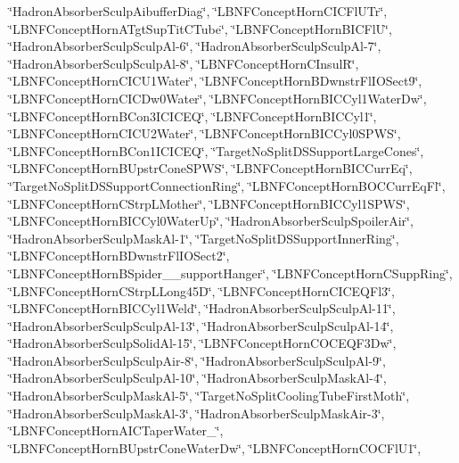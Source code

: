 {\char`\"{}Hadron\-Absorber\-Sculp\-Aibuffer\-Diag\char`\"{}, \char`\"{}L\-B\-N\-F\-Concept\-Horn\-C\-I\-C\-Fl\-U\-Tr\char`\"{}, \char`\"{}L\-B\-N\-F\-Concept\-Horn\-A\-Tgt\-Sup\-Tit\-C\-Tube\char`\"{}, \char`\"{}L\-B\-N\-F\-Concept\-Horn\-B\-I\-C\-Fl\-U\char`\"{}, \char`\"{}Hadron\-Absorber\-Sculp\-Sculp\-Al-\/6\char`\"{}, \char`\"{}Hadron\-Absorber\-Sculp\-Sculp\-Al-\/7\char`\"{}, \char`\"{}Hadron\-Absorber\-Sculp\-Sculp\-Al-\/8\char`\"{}, \char`\"{}L\-B\-N\-F\-Concept\-Horn\-C\-Insul\-R\char`\"{}, \char`\"{}L\-B\-N\-F\-Concept\-Horn\-C\-I\-C\-U1\-Water\char`\"{}, \char`\"{}L\-B\-N\-F\-Concept\-Horn\-B\-Dwnstr\-Fl\-I\-O\-Sect9\char`\"{}, \char`\"{}L\-B\-N\-F\-Concept\-Horn\-C\-I\-C\-Dw0\-Water\char`\"{}, \char`\"{}L\-B\-N\-F\-Concept\-Horn\-B\-I\-C\-Cyl1\-Water\-Dw\char`\"{}, \char`\"{}L\-B\-N\-F\-Concept\-Horn\-B\-Con3\-I\-C\-I\-C\-E\-Q\char`\"{}, \char`\"{}L\-B\-N\-F\-Concept\-Horn\-B\-I\-C\-Cyl1\char`\"{}, \char`\"{}L\-B\-N\-F\-Concept\-Horn\-C\-I\-C\-U2\-Water\char`\"{}, \char`\"{}L\-B\-N\-F\-Concept\-Horn\-B\-I\-C\-Cyl0\-S\-P\-W\-S\char`\"{}, \char`\"{}L\-B\-N\-F\-Concept\-Horn\-B\-Con1\-I\-C\-I\-C\-E\-Q\char`\"{}, \char`\"{}Target\-No\-Split\-D\-S\-Support\-Large\-Cones\char`\"{}, \char`\"{}L\-B\-N\-F\-Concept\-Horn\-B\-Upstr\-Cone\-S\-P\-W\-S\char`\"{}, \char`\"{}L\-B\-N\-F\-Concept\-Horn\-B\-I\-C\-Curr\-Eq\char`\"{}, \char`\"{}Target\-No\-Split\-D\-S\-Support\-Connection\-Ring\char`\"{}, \char`\"{}L\-B\-N\-F\-Concept\-Horn\-B\-O\-C\-Curr\-Eq\-Fl\char`\"{}, \char`\"{}L\-B\-N\-F\-Concept\-Horn\-C\-Strp\-L\-Mother\char`\"{}, \char`\"{}L\-B\-N\-F\-Concept\-Horn\-B\-I\-C\-Cyl1\-S\-P\-W\-S\char`\"{}, \char`\"{}L\-B\-N\-F\-Concept\-Horn\-B\-I\-C\-Cyl0\-Water\-Up\char`\"{}, \char`\"{}Hadron\-Absorber\-Sculp\-Spoiler\-Air\char`\"{}, \char`\"{}Hadron\-Absorber\-Sculp\-Mask\-Al-\/1\char`\"{}, \char`\"{}Target\-No\-Split\-D\-S\-Support\-Inner\-Ring\char`\"{}, \char`\"{}L\-B\-N\-F\-Concept\-Horn\-B\-Dwnstr\-Fl\-I\-O\-Sect2\char`\"{}, \char`\"{}L\-B\-N\-F\-Concept\-Horn\-B\-Spider\-\_\-\_\-support\-Hanger\char`\"{}, \char`\"{}L\-B\-N\-F\-Concept\-Horn\-C\-Supp\-Ring\char`\"{}, \char`\"{}L\-B\-N\-F\-Concept\-Horn\-C\-Strp\-L\-Long45\-D\char`\"{}, \char`\"{}L\-B\-N\-F\-Concept\-Horn\-C\-I\-C\-E\-Q\-Fl3\char`\"{}, \char`\"{}L\-B\-N\-F\-Concept\-Horn\-B\-I\-C\-Cyl1\-Weld\char`\"{}, \char`\"{}Hadron\-Absorber\-Sculp\-Sculp\-Al-\/11\char`\"{}, \char`\"{}Hadron\-Absorber\-Sculp\-Sculp\-Al-\/13\char`\"{}, \char`\"{}Hadron\-Absorber\-Sculp\-Sculp\-Al-\/14\char`\"{}, \char`\"{}Hadron\-Absorber\-Sculp\-Solid\-Al-\/15\char`\"{}, \char`\"{}L\-B\-N\-F\-Concept\-Horn\-C\-O\-C\-E\-Q\-F3\-Dw\char`\"{}, \char`\"{}Hadron\-Absorber\-Sculp\-Sculp\-Air-\/8\char`\"{}, \char`\"{}Hadron\-Absorber\-Sculp\-Sculp\-Al-\/9\char`\"{}, \char`\"{}Hadron\-Absorber\-Sculp\-Sculp\-Al-\/10\char`\"{}, \char`\"{}Hadron\-Absorber\-Sculp\-Mask\-Al-\/4\char`\"{}, \char`\"{}Hadron\-Absorber\-Sculp\-Mask\-Al-\/5\char`\"{}, \char`\"{}Target\-No\-Split\-Cooling\-Tube\-First\-Moth\char`\"{}, \char`\"{}Hadron\-Absorber\-Sculp\-Mask\-Al-\/3\char`\"{}, \char`\"{}Hadron\-Absorber\-Sculp\-Mask\-Air-\/3\char`\"{}, \char`\"{}L\-B\-N\-F\-Concept\-Horn\-A\-I\-C\-Taper\-Water\-\_\char`\"{}, \char`\"{}L\-B\-N\-F\-Concept\-Horn\-B\-Upstr\-Cone\-Water\-Dw\char`\"{}, \char`\"{}L\-B\-N\-F\-Concept\-Horn\-C\-O\-C\-Fl\-U1\char`\"{}, }
